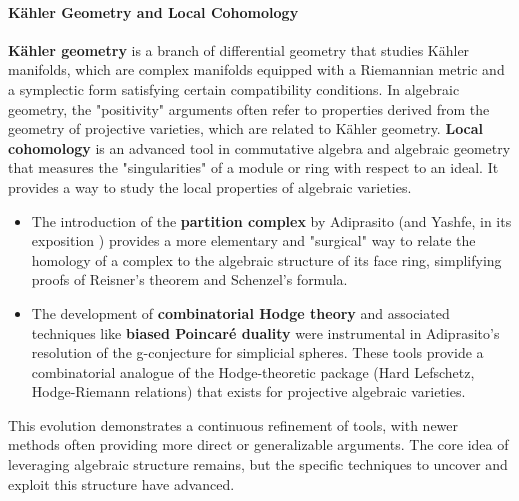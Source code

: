 \documentclass[12pt]{article}
\theoremstyle{definition}
\numberwithin{equation}{subsection}
\begin{document}
\begin{itemize}
\paragraph{Kähler Geometry and Local Cohomology}
\textbf{Kähler geometry} is a branch of differential geometry that studies Kähler manifolds, which are complex manifolds equipped with a Riemannian metric and a symplectic form satisfying certain compatibility conditions. In algebraic geometry, the "positivity" arguments often refer to properties derived from the geometry of projective varieties, which are related to Kähler geometry.
\textbf{Local cohomology} is an advanced tool in commutative algebra and algebraic geometry that measures the "singularities" of a module or ring with respect to an ideal. It provides a way to study the local properties of algebraic varieties.
\begin{itemize}
\item The introduction of the \textbf{partition complex} by Adiprasito (and Yashfe, in its exposition ) provides a more elementary and "surgical" way to relate the homology of a complex to the algebraic structure of its face ring, simplifying proofs of Reisner's theorem and Schenzel's formula.
\item The development of \textbf{combinatorial Hodge theory}  and associated techniques like \textbf{biased Poincaré duality}  were instrumental in Adiprasito's resolution of the g-conjecture for simplicial spheres. These tools provide a combinatorial analogue of the Hodge-theoretic package (Hard Lefschetz, Hodge-Riemann relations) that exists for projective algebraic varieties.
\end{itemize}
\end{itemize}
This evolution demonstrates a continuous refinement of tools, with newer methods often providing more direct or generalizable arguments. The core idea of leveraging algebraic structure remains, but the specific techniques to uncover and exploit this structure have advanced.   
\end{document}
